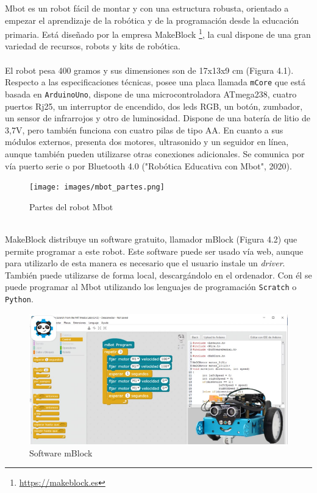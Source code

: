 \documentclass{report}
\begin{document}
Mbot es un robot fácil de montar y con una estructura robusta, orientado a empezar el aprendizaje de la robótica y de la programación desde la educación primaria. Está diseñado por la empresa MakeBlock \footnote{\url{https://makeblock.es}}, la cual dispone de una gran variedad de recursos, robots y kits de robótica.
\\
\\
El robot pesa 400 gramos y sus dimensiones son de 17x13x9 cm (Figura 4.1). Respecto a las especificaciones técnicas, posee una placa llamada \texttt{mCore} que está basada en \texttt{ArduinoUno}, dispone de una microcontroladora ATmega238, cuatro puertos Rj25, un interruptor de encendido, dos leds RGB, un botón, zumbador, un sensor de infrarrojos y otro de luminosidad. Dispone de una batería de litio de 3,7V, pero también funciona con cuatro pilas de tipo AA. En cuanto a sus módulos externos, presenta dos motores, ultrasonido y un seguidor en línea, aunque también pueden utilizarse otras conexiones adicionales. Se comunica por vía puerto serie o por Bluetooth 4.0 ("Robótica Educativa con Mbot", 2020).
\begin{figure}[h!]
  \centering
    \texttt{[image: images/mbot\_partes.png]}
  \caption{Partes del robot Mbot}
  \label{Partes del robot Mbot}
\end{figure}
\\
MakeBlock distribuye un software gratuito, llamador mBlock (Figura 4.2) que permite programar a este robot. Este software puede ser usado vía web, aunque para utilizarlo de esta manera es necesario que el usuario instale un \textit{driver}. También puede utilizarse de forma local, descargándolo en el ordenador. Con él se puede programar al Mbot utilizando los lenguajes de programación \texttt{Scratch} o \texttt{Python}.
\\
\begin{figure}[h!]
  \centering
    \includegraphics[width=1\textwidth]{images/software_mBlock.png}
  \caption{Software mBlock}
  \label{Software mBlock}
\end{figure}
\end{document}
